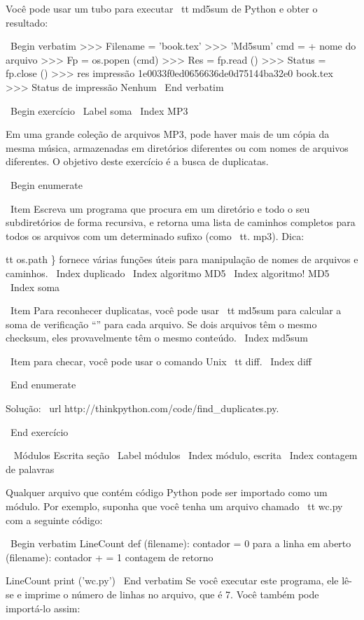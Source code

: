 \documentclass[10pt]{book}
\begin{document}
{{{{{{{{{{Você pode usar um tubo para executar {\ tt md5sum} de Python e obter o resultado:

\ Begin {verbatim}
>>> Filename = 'book.tex'
>>> 'Md5sum' cmd = + nome do arquivo
>>> Fp = os.popen (cmd)
>>> Res = fp.read ()
>>> Status = fp.close ()
>>> res impressão
1e0033f0ed0656636de0d75144ba32e0 book.tex
>>> Status de impressão
Nenhum
\ End {verbatim}


\ Begin {} exercício
\ Label {soma}
\ Index {MP3}

Em uma grande coleção de arquivos MP3, pode haver mais de um
cópia da mesma música, armazenadas em diretórios diferentes ou com
nomes de arquivos diferentes. O objetivo deste exercício é a busca de
duplicatas.

\ Begin {enumerate}

\ Item Escreva um programa que procura em um diretório e todo o seu
subdiretórios de forma recursiva, e retorna uma lista de caminhos completos
para todos os arquivos com um determinado sufixo (como {\ tt. mp3}).
Dica: {tt os.path \} fornece várias funções úteis para
manipulação de nomes de arquivos e caminhos.
\ Index {} duplicado
\ Index {algoritmo MD5}
\ Index {algoritmo! MD5}
\ Index {soma}

\ Item Para reconhecer duplicatas, você pode usar {\ tt md5sum}
para calcular a soma de verificação ``'' para cada arquivo. Se dois arquivos têm
o mesmo checksum, eles provavelmente têm o mesmo conteúdo.
\ Index {} md5sum

\ Item para checar, você pode usar o comando Unix {\ tt diff}.
\ Index {diff}

\ End {enumerate}

Solução: \ url {http://thinkpython.com/code/find_duplicates.py}.

\ End {} exercício


\ {} Módulos Escrita seção
\ Label {módulos}
\ Index {módulo, escrita}
\ Index {contagem de palavras}

Qualquer arquivo que contém código Python pode ser importado como um módulo.
Por exemplo, suponha que você tenha um arquivo chamado {\ tt wc.py} com a seguinte
código:

\ Begin {verbatim}
LineCount def (filename):
    contador = 0
    para a linha em aberto (filename):
        contador + = 1
    contagem de retorno

LineCount print ('wc.py')
\ End {verbatim}
%
Se você executar este programa, ele lê-se e imprime o número
de linhas no arquivo, que é 7.
Você também pode importá-lo assim:

}}}}}}}}}}}
\end{document}

